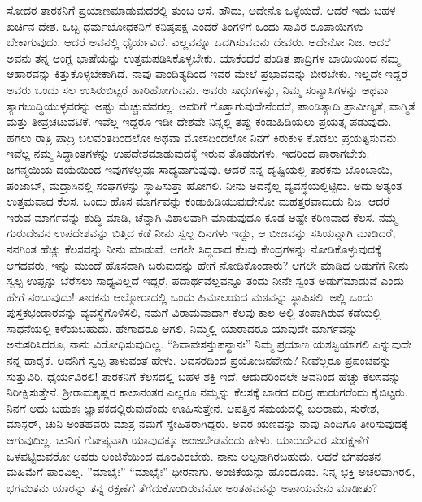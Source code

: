 ಸೋದರ ತಾರಕನಿಗೆ ಪ್ರಯಾಣಮಾಡುವುದರಲ್ಲಿ ತುಂಬ ಆಸೆ. ಹೌದು, ಅದೇನೊ ಒಳ್ಳೆಯದೆ. ಆದರೆ ಇದು ಬಹಳ ಖರ್ಚಿನ ದೇಶ. ಒಬ್ಬ ಧರ್ಮಬೋಧಕನಿಗೆ ಕನಿಷ್ಠಪಕ್ಷ ಎಂದರೆ ತಿಂಗಳಿಗೆ ಒಂದು ಸಾವಿರ ರೂಪಾಯಿಗಳು ಬೇಕಾಗುವುದು. ಆದರೆ ಅವನಲ್ಲಿ ಧೈರ್ಯವಿದೆ. ಎಲ್ಲವನ್ನೂ ಒದಗಿಸುವವನು ದೇವರು. ಅದೇನೋ ನಿಜ. ಆದರೆ ಅವನು ತನ್ನ ಆಂಗ್ಲ ಭಾಷೆಯನ್ನು ಉತ್ತಮಪಡಿಸಿಕೊಳ್ಳಬೇಕು. ಯಾಕೆಂದರೆ ಪಂಡಿತ ಪಾದ್ರಿಗಳ ಬಾಯಿಯಿಂದ ನಮ್ಮ ಆಹಾರವನ್ನು ಕಿತ್ತುಕೊಳ್ಳಬೇಕಾಗಿದೆ. ನಾವು ಪಾಂಡಿತ್ಯದಿಂದ ಇವರ ಮೇಲೆ ಪ್ರಭಾವವನ್ನು ಬೀರಬೇಕು. ಇಲ್ಲದೇ ಇದ್ದರೆ ಅವರು ಒಂದು ಸಲ ಉಸಿರುಬಿಟ್ಟರೆ ಹಾರಿಹೋಗುವನು. ಅವರು ಸಾಧುಗಳನ್ನು, ನಿಮ್ಮ ಸಂನ್ಯಾಸಿಗಳನ್ನು ಅಥವಾ ತ್ಯಾಗಬುದ್ಧಿಯುಳ್ಳವರನ್ನು ಅಷ್ಟು ಮೆಚ್ಚುವವರಲ್ಲ. ಅವರಿಗೆ ಗೊತ್ತಾಗುವುದೇನೆಂದರೆ, ಪಾಂಡಿತ್ಯಾದಿ ಪ್ರಾವೀಣ್ಯತೆ, ವಾಗ್ಮಿತೆ ಮತ್ತು ತೀವ್ರಚಟುವಟಿಕೆ. ಇವೆಲ್ಲ ಇದ್ದರೂ ಇಡೀ ದೇಶವೇ ನಿನ್ನಲ್ಲಿ ತಪ್ಪು ಕಂಡುಹಿಡಿಯಲು ಪ್ರಯತ್ನ ಪಡುವುದು. ಹಗಲು ರಾತ್ರಿ ಪಾದ್ರಿ ಬಲವಂತದಿಂದಲೋ ಅಥವಾ ಮೋಸದಿಂದಲೋ ನಿನಗೆ ಕಿರುಕುಳ ಕೊಡಲು ಪ್ರಯತ್ನಿಸುವನು. ಇವೆಲ್ಲ ನಮ್ಮ ಸಿದ್ಧಾಂತಗಳನ್ನು ಉಪದೇಶಮಾಡುವುದಕ್ಕೆ ಇರುವ ತೊಡಕುಗಳು. ಇದರಿಂದ ಪಾರಾಗಬೇಕು. ಜಗನ್ಮಯಿಯ ದಯೆಯಿಂದ ಇವುಗಳೆಲ್ಲವೂ ಸಾಧ್ಯವಾಗುವುವು. ಆದರೆ ನನ್ನ ದೃಷ್ಟಿಯಲ್ಲಿ ತಾರಕನು ಬೊಂಬಾಯಿ, ಪಂಜಾಬ್, ಮದ್ರಾಸಿನಲ್ಲಿ ಸಂಘಗಳನ್ನು ಸ್ಥಾಪಿಸುತ್ತಾ ಹೋಗಲಿ. ನೀನು ಅದನ್ನೆಲ್ಲ ವ್ಯವಸ್ಥೆಯಲ್ಲಿಟ್ಟಿರು. ಅದು ಅತ್ಯಂತ ಉತ್ತಮವಾದ ಕೆಲಸ. ಒಂದು ಹೊಸ ಮಾರ್ಗವನ್ನು ಕಂಡುಹಿಡಿಯುವುದೇನೋ ಮಹತ್ತರವಾದುದು ನಿಜ. ಆದರೆ ಇರುವ ಮಾರ್ಗವನ್ನು ಶುದ್ಧಿ ಮಾಡಿ, ಚೆನ್ನಾಗಿ ವಿಶಾಲವಾಗಿ ಮಾಡುವುದೂ ಕೂಡ ಅಷ್ಟೇ ಕಠಿಣವಾದ ಕೆಲಸ. ನಮ್ಮ ಗುರುದೇವನ ಉಪದೇಶವನ್ನು ಬಿತ್ತಿದ ಕಡೆ ನೀನು ಸ್ವಲ್ಪ ದಿನಗಳು ಇದ್ದು, ಆ ಬೀಜವನ್ನು ಸಸಿಯನ್ನಾಗಿ ಮಾಡಿದರೆ, ನನಗಿಂತ ಹೆಚ್ಚು ಕೆಲಸವನ್ನು ನೀನು ಮಾಡುವೆ. ಆಗಲೇ ಸಿದ್ಧವಾದ ಕೆಲವು ಕೇಂದ್ರಗಳನ್ನು ನೋಡಿಕೊಳ್ಳುವುದಕ್ಕೆ ಆಗದವರು, ಇನ್ನು ಮುಂದೆ ಹೊಸದಾಗಿ ಬರುವುದನ್ನು ಹೇಗೆ ನೋಡಿಕೊಂಡಾರು? ಆಗಲೇ ಮಾಡಿದ ಅಡುಗೆಗೆ ನೀನು ಸ್ವಲ್ಪ ಉಪ್ಪನ್ನು ಬೆರೆಸಲು ಸಾಧ್ಯವಿಲ್ಲದೆ ಇದ್ದರೆ, ಪದಾರ್ಥವೆಲ್ಲವನ್ನೂ ತಂದು ನೀನೇ ಸ್ವಂತ ಅಡುಗೆಮಾಡುವೆ ಎಂದು ಹೇಗೆ ನಂಬುವುದು! ತಾರಕನು ಆಲ್ಮೋರಾದಲ್ಲಿ ಒಂದು ಹಿಮಾಲಯದ ಮಠವನ್ನು ಸ್ಥಾಪಿಸಲಿ. ಅಲ್ಲಿ ಒಂದು ಪುಸ್ತಕಭಂಡಾರವನ್ನು ವ್ಯವಸ್ಥೆಗೊಳಿಸಲಿ, ನಮಗೆ ವಿರಾಮವಾದಾಗ ಕೆಲವು ಕಾಲ ಅಲ್ಲಿ ತಂಪಾಗಿರುವ ಕಡೆಯಲ್ಲಿ ಸಾಧನೆಯಲ್ಲಿ ಕಳೆಯಬಹುದು. ಹೇಗಾದರೂ ಆಗಲಿ, ನಿಮ್ಮಲ್ಲಿ ಯಾರಾದರೂ ಯಾವುದೇ ಮಾರ್ಗವನ್ನು ಅನುಸರಿಸಿದರೂ, ನಾನು ವಿರೋಧಿಸುವುದಿಲ್ಲ. “ಶಿವಾವಃಸನ್ತುಪನ್ಥಾನಃ” ನಿಮ್ಮ ಪ್ರಯಾಣ ಯಶಸ್ವಿಯಾಗಲಿ ಎನ್ನುವುದೇ ನನ್ನ ಹಾರೈಕೆ.\enginline{-} ಅವನಿಗೆ ಸ್ವಲ್ಪ ತಾಳುವಂತೆ ಹೇಳು. ಅವಸರದಿಂದ ಪ್ರಯೋಜನವೇನು? ನೀವೆಲ್ಲರೂ ಪ್ರಪಂಚವನ್ನು ಸುತ್ತುವಿರಿ. ಧೈರ್ಯವಿರಲಿ! ತಾರಕನಿಗೆ ಕೆಲಸದಲ್ಲಿ ಬಹಳ ಶಕ್ತಿ ಇದೆ. ಆದುದರಿಂದಲೇ ಅವನಿಂದ ಹೆಚ್ಚು ಕೆಲಸವನ್ನು ನಿರೀಕ್ಷಿಸುತ್ತೇನೆ. ಶ‍್ರೀರಾಮಕೃಷ್ಣರ ಕಾಲಾನಂತರ ಎಲ್ಲರೂ ನಮ್ಮನ್ನು ಕೆಲಸಕ್ಕೆ ಬಾರದ ದರಿದ್ರ ಹುಡುಗರೆಂದು ಕೈಬಿಟ್ಟರು. ನಿನಗೆ ಅದು ಬಹುಶಃ ಜ್ಞಾಪಕದಲ್ಲಿರುವುದೆಂದು ಊಹಿಸುತ್ತೇನೆ. ಆಪತ್ತಿನ ಸಮಯದಲ್ಲಿ ಬಲರಾಮ, ಸುರೇಶ, ಮಾಸ್ಟರ್‌, ಚುನಿ ಅಂತಹವರು ಮಾತ್ರ ನಮಗೆ ಸ್ನೇಹಿತರಾಗಿದ್ದರು. ಅವರ ಋಣವನ್ನು ನಾವು ಎಂದಿಗೂ ತೀರಿಸುವುದಕ್ಕೆ ಆಗುವುದಿಲ್ಲ. ಚುನಿಗೆ ಗೋಪ್ಯವಾಗಿ ಯಾವುದಕ್ಕೂ ಅಂಜಬೇಡವೆಂದು ಹೇಳು. ಯಾರುದೇವರ ಸಂರಕ್ಷಣೆಗೆ ಒಳಪಟ್ಟಿರುವರೋ ಅವರು ಅಂಜಿಕೆಯಿಂದ ದೂರವಿರಬೇಕು. ನಾನು ಅಲ್ಪನಾಗಿರಬಹುದು. ಆದರೆ ಭಗವಂತನ ಮಹಿಮೆಗೆ ಪಾರವಿಲ್ಲ. ”ಮಾಭೈಃ” “ಮಾಭೈಃ” ಧೀರನಾಗು. ಅಂಜಿಕೆಯನ್ನು ಹೊರದೂಡು. ನಿನ್ನ ಭಕ್ತಿ ಅಚಲವಾಗಿರಲಿ, ಭಗವಂತನು ಯಾರನ್ನು ತನ್ನ ರಕ್ಷಣೆಗೆ ತೆಗೆದುಕೊಂಡಿರುವನೋ ಅಂತಹವನನ್ನು ಅಪಾಯವೇನು ಮಾಡೀತು?

